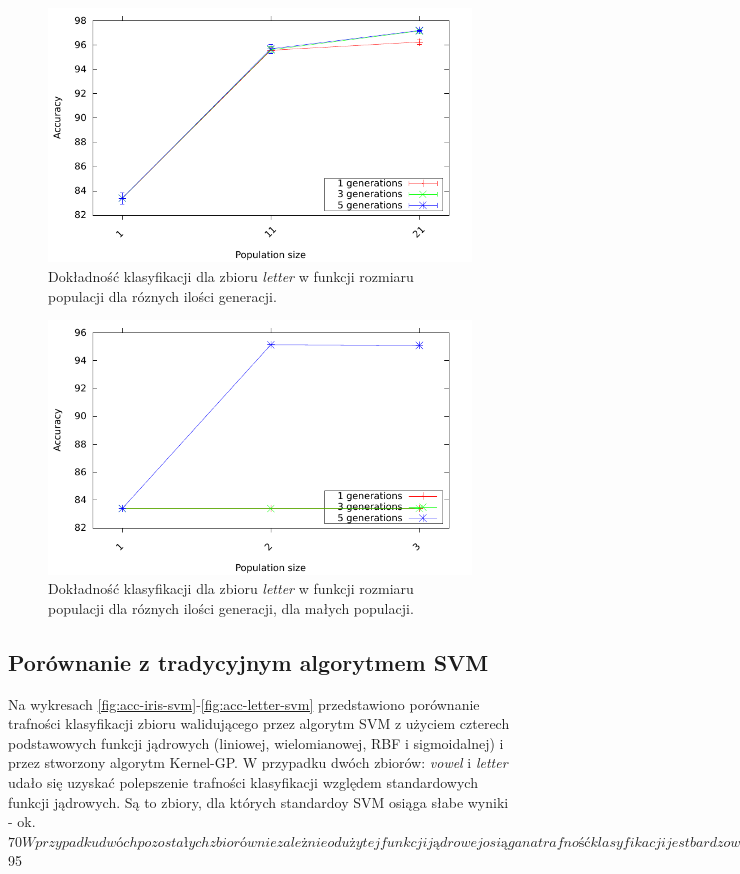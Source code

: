 \documentclass{article}
\begin{document}
	
		\begin{figure}[ht]
		\includegraphics[scale=0.90]{figures/accuracy-letter}
		\caption{Dokładność klasyfikacji dla zbioru \emph{letter} w funkcji rozmiaru populacji dla róznych ilości generacji.\label{fig:acc-letter}}
	\end{figure}
		
				\begin{figure}[ht]
		\includegraphics[scale=0.90]{figures/accuracy-letter-detailed}
		\caption{Dokładność klasyfikacji dla zbioru \emph{letter} w funkcji rozmiaru populacji dla róznych ilości generacji, dla małych populacji.\label{fig:acc-letter-detailed}}
	\end{figure}
		


	\subsection{Porównanie z tradycyjnym algorytmem SVM}
	Na wykresach \ref{fig:acc-iris-svm}-\ref{fig:acc-letter-svm} przedstawiono porównanie trafności klasyfikacji zbioru walidującego przez algorytm SVM z użyciem czterech podstawowych funkcji jądrowych (liniowej, wielomianowej, RBF i sigmoidalnej) i przez stworzony algorytm Kernel-GP.
	W przypadku dwóch zbiorów: \emph{vowel} i \emph{letter} udało się uzyskać polepszenie trafności klasyfikacji względem standardowych funkcji jądrowych. Są to zbiory, dla których standardoy SVM osiąga słabe wyniki - ok. $ 70%
	W przypadku dwóch pozostałych zbiorów niezależnie od użytej funkcji jądrowej osiągana trafność klasyfikacji jest bardzo wysoka - ok. $ 95%
	
\end{document}
